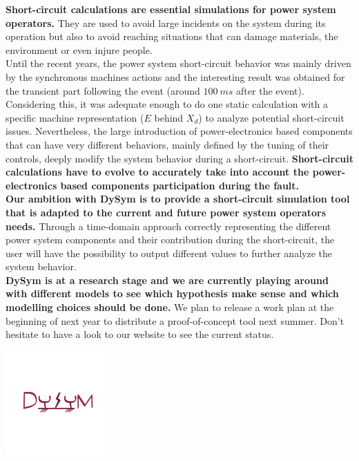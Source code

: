 \documentclass[a4paper, 12pt]{report}
\begin{document}
\textbf{Short-circuit calculations are essential simulations for power system operators.} They are used to avoid large incidents on the system during its operation but also to avoid reaching situations that can damage materials, the environment or even injure people. \\

Until the recent years, the power system short-circuit behavior was mainly driven by the synchronous machines actions and the interesting result was obtained for the transient part following the event (around $100 \ ms$ after the event). Considering this, it was adequate enough to do one static calculation with a specific machine representation ($E$ behind $X_{d}$) to analyze potential short-circuit issues. Nevertheless, the large introduction of power-electronics based components that can have very different behaviors, mainly defined by the tuning of their controls, deeply modify the system behavior during a short-circuit. \textbf{Short-circuit calculations have to evolve to accurately take into account the power-electronics based components participation during the fault.} \\

\textbf{Our ambition with DySym is to provide a short-circuit simulation tool that is adapted to the current and future power system operators needs.} Through a time-domain approach correctly representing the different power system components and their contribution during the short-circuit, the user will have the possibility to output different values to further analyze the system behavior. \\

\textbf{DySym is at a research stage and we are currently playing around with different models to see which hypothesis make sense and which modelling choices should be done.} We plan to release a work plan at the beginning of next year to distribute a proof-of-concept tool next summer. Don't hesitate to have a look to our website to see the current status.

\begin{center}
\includegraphics[width=0.3\textwidth]{../resources/DySym.png}
\end{center}
\end{document}
